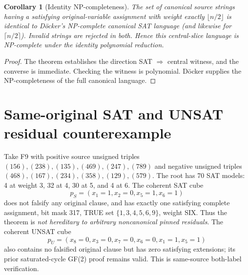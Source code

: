 \documentclass[11pt]{article}
\newtheorem{corollary}[theorem]{Corollary}
\begin{document}
\begin{corollary}[Identity NP-completeness]
The set of canonical source strings having a satisfying original-variable assignment with weight exactly $\lfloor n/2\rfloor$ is \emph{identical} to D\"ocker's NP-complete canonical SAT language (and likewise for $\lceil n/2\rceil$). Invalid strings are rejected in both. Hence this central-slice language is NP-complete under the identity polynomial reduction.
\end{corollary}
\begin{proof}
The theorem establishes the direction SAT $\Rightarrow$ central witness, and the converse is immediate. Checking the witness is polynomial. D\"ocker supplies the NP-completeness of the full canonical language.
\end{proof}
\section{Same-original SAT and UNSAT residual counterexample}
Take F9 with positive source unsigned triples $(156),(238),(135),(469),(247),(789)$ and negative unsigned triples $(468),(167),(234),(358),(129),(579)$. The root has 70 SAT models: 4 at weight 3, 32 at 4, 30 at 5, and 4 at 6. The coherent SAT cube
\[
p_S=(x_1=1,x_2=0,x_5=1,x_6=1)
\]
does not falsify any original clause, and has exactly one satisfying complete assignment, bit mask 317, TRUE set $\{1,3,4,5,6,9\}$, weight SIX. Thus the theorem is \emph{not hereditary to arbitrary noncanonical pinned residuals}. The coherent UNSAT cube
\[
p_U=(x_8=0,x_3=0,x_7=0,x_6=0,x_1=1,x_5=1)
\]
also contains no falsified original clause but has zero satisfying extensions; its prior saturated-cycle GF(2) proof remains valid. This is same-source both-label verification.
\end{document}

